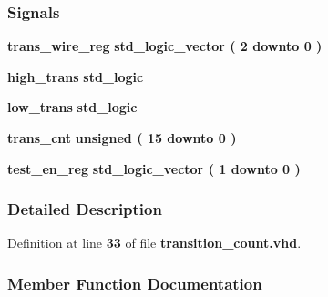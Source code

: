 \subsubsection*{Signals}
 \begin{DoxyCompactItemize}
\item 
{\bf trans\+\_\+wire\+\_\+reg} {\bfseries \textcolor{comment}{std\+\_\+logic\+\_\+vector}\textcolor{vhdlchar}{ }\textcolor{vhdlchar}{(}\textcolor{vhdlchar}{ }\textcolor{vhdlchar}{ } \textcolor{vhdldigit}{2} \textcolor{vhdlchar}{ }\textcolor{keywordflow}{downto}\textcolor{vhdlchar}{ }\textcolor{vhdlchar}{ } \textcolor{vhdldigit}{0} \textcolor{vhdlchar}{ }\textcolor{vhdlchar}{)}\textcolor{vhdlchar}{ }} 
\item 
{\bf high\+\_\+trans} {\bfseries \textcolor{comment}{std\+\_\+logic}\textcolor{vhdlchar}{ }} 
\item 
{\bf low\+\_\+trans} {\bfseries \textcolor{comment}{std\+\_\+logic}\textcolor{vhdlchar}{ }} 
\item 
{\bf trans\+\_\+cnt} {\bfseries \textcolor{comment}{unsigned}\textcolor{vhdlchar}{ }\textcolor{vhdlchar}{(}\textcolor{vhdlchar}{ }\textcolor{vhdlchar}{ } \textcolor{vhdldigit}{15} \textcolor{vhdlchar}{ }\textcolor{keywordflow}{downto}\textcolor{vhdlchar}{ }\textcolor{vhdlchar}{ } \textcolor{vhdldigit}{0} \textcolor{vhdlchar}{ }\textcolor{vhdlchar}{)}\textcolor{vhdlchar}{ }} 
\item 
{\bf test\+\_\+en\+\_\+reg} {\bfseries \textcolor{comment}{std\+\_\+logic\+\_\+vector}\textcolor{vhdlchar}{ }\textcolor{vhdlchar}{(}\textcolor{vhdlchar}{ }\textcolor{vhdlchar}{ } \textcolor{vhdldigit}{1} \textcolor{vhdlchar}{ }\textcolor{keywordflow}{downto}\textcolor{vhdlchar}{ }\textcolor{vhdlchar}{ } \textcolor{vhdldigit}{0} \textcolor{vhdlchar}{ }\textcolor{vhdlchar}{)}\textcolor{vhdlchar}{ }} 
\end{DoxyCompactItemize}


\subsubsection{Detailed Description}


Definition at line {\bf 33} of file {\bf transition\+\_\+count.\+vhd}.



\subsubsection{Member Function Documentation}
